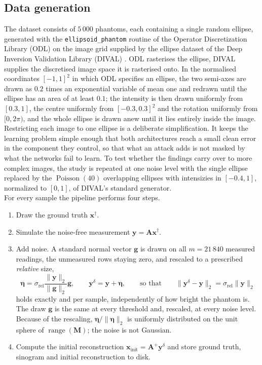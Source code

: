 \documentclass{article}
\numberwithin{equation}{section}
\begin{document}
\subsection{Data generation}\label{sec:data}
The dataset consists of $5\,000$ phantoms, each containing a single random
ellipse, generated with the \texttt{ellipsoid\_phantom} routine of the Operator
Discretization Library (ODL) \parencite{ODL} on the image grid supplied by the ellipse
dataset of the Deep Inversion Validation Library (DIVAL) \parencite{DIVAL}. ODL rasterises
the ellipse, DIVAL supplies the discretised image space it is
rasterised onto. In the normalised coordinates ${[-1,1]}^2$ in which ODL specifies an ellipse,
the two semi-axes are drawn as $0.2$ times an exponential variable of mean one and redrawn until
the ellipse has an area of at least $0.1$; the intensity is then drawn uniformly from $[0.3,1]$,
the centre uniformly from ${[-0.3,0.3]}^2$ and the rotation uniformly from $\lbrack 0,2\pi\rparen$, and the
whole ellipse is drawn anew until it lies entirely inside the image. Restricting each image to one ellipse is a
deliberate simplification. It keeps the learning problem simple enough that both
architectures reach a small clean error in the component they control, so that what an attack adds
is not masked by what the networks fail to learn.
To test whether the findings carry over to more complex images, the study is repeated at one noise level with the single ellipse replaced by
the $\operatorname{Poisson}(40)$ overlapping ellipses with intensizies in $[-0.4,1]$, normalized to $[0,1]$, of DIVAL's standard generator.\\
For every sample the pipeline performs four steps.
\begin{enumerate}
    \item Draw the ground truth $\mathbf{x}^\dagger$.
    \item Simulate the noise-free measurement $\mathbf{y}=\mathbf{A}\mathbf{x}^\dagger$.
    \item Add noise. A standard normal vector $\mathbf{g}$ is drawn on all $m=21\,840$ measured readings,
    the unmeasured rows staying zero, and rescaled to a prescribed \emph{relative} size,
    \[\boldsymbol{\eta}=\sigma_\text{rel}\frac{\lVert\mathbf{y}\rVert_2}{\lVert\mathbf{g}\rVert_2}\mathbf{g},
    \qquad \mathbf{y}^\delta=\mathbf{y}+\boldsymbol{\eta},
    \qquad\text{so that}\qquad
    \lVert\mathbf{y}^\delta-\mathbf{y}\rVert_2=\sigma_\text{rel}\lVert\mathbf{y}\rVert_2\]
    holds exactly and per sample, independently of how bright the phantom is. The draw $\mathbf{g}$ is the
    same at every threshold and, rescaled, at every noise level. Because of the rescaling,
    $\boldsymbol{\eta}/\lVert\boldsymbol{\eta}\rVert_2$ is uniformly distributed on the unit sphere of
    $\operatorname{range}(\mathbf{M})$; the noise is not Gaussian.
    \item Compute the initial reconstruction
    $\mathbf{x}_\text{init}=\mathbf{A}^+\mathbf{y}^\delta$ and store ground
    truth, sinogram and initial reconstruction to disk.
\end{enumerate}
\end{document}
